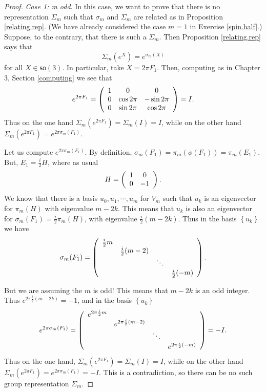\documentclass{amsbook}
\theoremstyle{plain}
\numberwithin{equation}{chapter}
\numberwithin{theorem}{chapter}
\begin{document}
\begin{proof}
\textit{Case 1: m odd}. In this case, we want to prove that there is no
representation $\Sigma_{m}$ such that $\sigma_{m}$ and $\Sigma_{m}$ are
related as in Proposition \ref{relating.rep}. (We have already considered the
case $m=1$ in Exercise \ref{spin.half}.) Suppose, to the contrary, that there
is such a $\Sigma_{m}$. Then Proposition \ref{relating.rep} says that
\[
\Sigma_{m}(e^{X})=e^{\sigma_{m}(X)}%
\]
for all $X\in\mathsf{so}(3)$. In particular, take $X=2\pi F_{1}$. Then,
computing as in Chapter 3, Section \ref{computing} we see that
\[
e^{2\pi F_{1}}=\left(
\begin{array}
[c]{ccc}%
1 & 0 & 0\\
0 & \cos2\pi & -\sin2\pi\\
0 & \sin2\pi & \cos2\pi
\end{array}
\right)  =I\text{.}%
\]
Thus on the one hand $\Sigma_{m}\left(  e^{2\pi F_{1}}\right)  =\Sigma
_{m}(I)=I$, while on the other hand $\Sigma_{m}\left(  e^{2\pi F_{1}}\right)
=e^{2\pi\sigma_{m}(F_{1})}$.

Let us compute $e^{2\pi\sigma_{m}(F_{1})}$. By definition, $\sigma_{m}%
(F_{1})=\pi_{m}(\phi(F_{1}))=\pi_{m}(E_{1})$. But, $E_{1}=\frac{i}{2}H$, where
as usual
\[
H=\left(
\begin{array}
[c]{cc}%
1 & 0\\
0 & -1
\end{array}
\right)  \text{.}%
\]
We know that there is a basis $u_{0},u_{1},\cdots,u_{m}$ for $V_{m}$ such that
$u_{k}$ is an eigenvector for $\pi_{m}(H)$ with eigenvalue $m-2k$. This means
that $u_{k}$ is also an eigenvector for $\sigma_{m}(F_{1})=\frac{i}{2}\pi
_{m}(H)$, with eigenvalue $\frac{i}{2}(m-2k)$. Thus in the basis $\left\{
u_{k}\right\}  $ we have
\[
\sigma_{m}(F_{1})=\left(
\begin{array}
[c]{cccc}%
\frac{i}{2}m &  &  & \\
& \frac{i}{2}(m-2) &  & \\
&  & \ddots & \\
&  &  & \frac{i}{2}(-m)
\end{array}
\right)  \text{.}%
\]

But we are assuming the $m$ is odd! This means that $m-2k$ is an odd integer.
Thus $e^{2\pi\frac{i}{2}(m-2k)}=-1$, and in the basis $\left\{  u_{k}\right\}
$%
\[
e^{2\pi\sigma_{m}(F_{1})}=\left(
\begin{array}
[c]{cccc}%
e^{2\pi\frac{i}{2}m} &  &  & \\
& e^{2\pi\frac{i}{2}(m-2)} &  & \\
&  & \ddots & \\
&  &  &  e^{2\pi\frac{i}{2}(-m)}%
\end{array}
\right)  =-I\text{.}%
\]
Thus on the one hand, $\Sigma_{m}\left(  e^{2\pi F_{1}}\right)  =\Sigma
_{m}(I)=I$, while on the other hand $\Sigma_{m}\left(  e^{2\pi F_{1}}\right)
=e^{2\pi\sigma_{m}(F_{1})}=-I$. This is a contradiction, so there can be no
such group representation $\Sigma_{m}$.


\end{proof}
\end{document}

